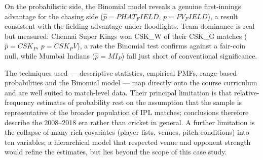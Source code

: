\documentclass[11pt,a4paper]{article}
\begin{document}
On the probabilistic side, the Binomial model reveals a genuine first-innings
advantage for the chasing side ($\hat{p} = PHAT_FIELD$,
$p = PV_FIELD$), a result consistent with the fielding
advantage under floodlights. Team dominance is real but measured: Chennai Super
Kings won CSK_W of their CSK_G matches
($\hat{p} = CSK_P$, $p = CSK_PV$), a rate the
Binomial test confirms against a fair-coin null, while Mumbai Indians
($\hat{p} = MI_P$) fall just short of conventional significance.

The techniques used --- descriptive statistics, empirical PMFs, range-based
probabilities and the Binomial model --- map directly onto the course curriculum
and are well suited to match-level data. Their principal limitation is that
relative-frequency estimates of probability rest on the assumption that the
sample is representative of the broader population of IPL matches; conclusions
therefore describe the 2008--2018 era rather than cricket in general. A further
limitation is the collapse of many rich covariates (player lists, venues, pitch
conditions) into ten variables; a hierarchical model that respected venue and
opponent strength would refine the estimates, but lies beyond the scope of this
case study.
\end{document}
